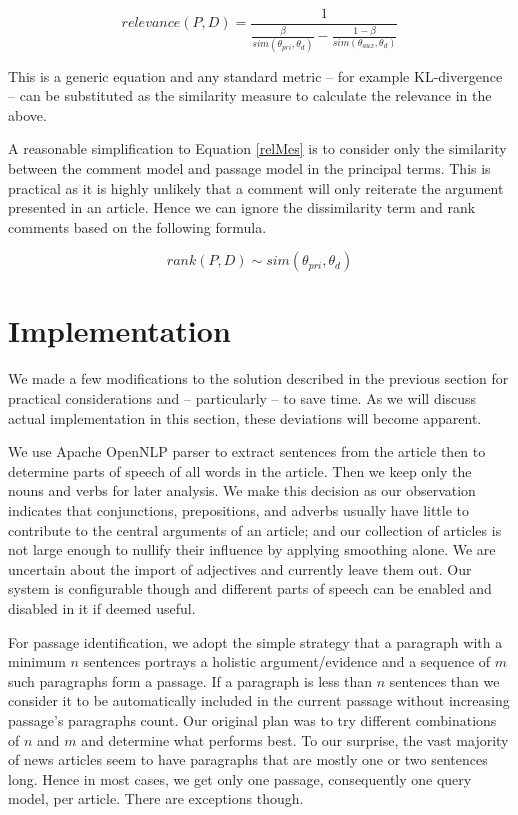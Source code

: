 \documentclass[article]{IEEEtran}
\begin{document}
\begin{equation}
\label{relMes}
relevance(P,D) = \frac{1}{\frac{\beta}{sim(\theta_{pri}, \theta_d)} - \frac{1 - \beta}{sim(\theta_{aux}, \theta_d)}}
\end{equation}           

This is a generic equation and any standard metric -- for example KL-divergence -- can be substituted as the similarity measure to calculate the relevance in the above.

A reasonable simplification to Equation \ref{relMes} is to consider only the similarity between the comment model and passage model in the principal terms. This is practical as it is highly unlikely that a comment will only reiterate the argument presented in an article. Hence we can ignore the dissimilarity term and rank comments based on the following formula.

\begin{equation}
\label{rank}
rank(P,D) \sim sim(\theta_{pri}, \theta_d)
\end{equation} 

\section{Implementation}
\label{si}
We made a few modifications to the solution described in the previous section for practical considerations and -- particularly -- to save time. As we will discuss actual implementation in this section, these deviations will become apparent.   

We use Apache OpenNLP parser \cite{openNLP} to extract sentences from the article then to determine parts of speech of all words in the article. Then we keep only the nouns and verbs for later analysis. We make this decision as our observation indicates that conjunctions, prepositions, and adverbs usually have little to contribute to the central arguments of an article; and our collection of articles is not large enough to nullify their influence by applying smoothing alone. We are uncertain about the import of adjectives and currently leave them out. Our system is configurable though and different parts of speech can be enabled and disabled in it if deemed useful.

For passage identification, we adopt the simple strategy that a paragraph with a minimum $n$ sentences portrays a holistic argument/evidence and a sequence of $m$ such paragraphs form a passage. If a paragraph is less than $n$ sentences than we consider it to be automatically included in the current passage without increasing passage's paragraphs count. Our original plan was to try different combinations of $n$ and $m$ and determine what performs best. To our surprise, the vast majority of news articles seem to have paragraphs that are mostly one or two sentences long. Hence in most cases, we get only one passage, consequently one query model, per article. There are exceptions though.                     
\end{document}
